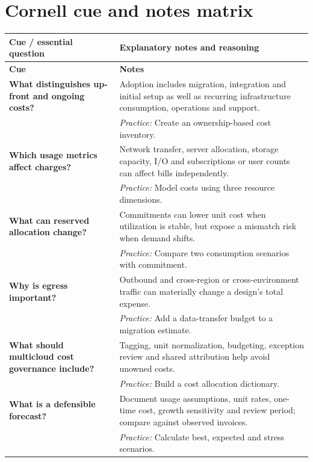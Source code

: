 \documentclass[10pt,letterpaper]{article}
\begin{document}
\section{Cornell cue and notes matrix}
\small\setlength{\LTleft}{0pt}\setlength{\LTright}{0pt plus 1fill}
\begin{longtable}{>{\RaggedRight\arraybackslash}p{}>{\RaggedRight\arraybackslash}p{}}
\toprule\textbf{Cue / essential question}&\textbf{Explanatory notes and reasoning}\\\midrule\endfirsthead\toprule\textbf{Cue}&\textbf{Notes}\\\midrule\endhead
\textbf{What distinguishes up-front and ongoing costs?} & Adoption includes migration, integration and initial setup as well as recurring infrastructure consumption, operations and support.\\[3pt]& \textcolor{petrol}{\emph{Practice:} Create an ownership-based cost inventory.}\\[8pt]\midrule
\textbf{Which usage metrics affect charges?} & Network transfer, server allocation, storage capacity, I/O and subscriptions or user counts can affect bills independently.\\[3pt]& \textcolor{petrol}{\emph{Practice:} Model costs using three resource dimensions.}\\[8pt]\midrule
\textbf{What can reserved allocation change?} & Commitments can lower unit cost when utilization is stable, but expose a mismatch risk when demand shifts.\\[3pt]& \textcolor{petrol}{\emph{Practice:} Compare two consumption scenarios with commitment.}\\[8pt]\midrule
\textbf{Why is egress important?} & Outbound and cross-region or cross-environment traffic can materially change a design's total expense.\\[3pt]& \textcolor{petrol}{\emph{Practice:} Add a data-transfer budget to a migration estimate.}\\[8pt]\midrule
\textbf{What should multicloud cost governance include?} & Tagging, unit normalization, budgeting, exception review and shared attribution help avoid unowned costs.\\[3pt]& \textcolor{petrol}{\emph{Practice:} Build a cost allocation dictionary.}\\[8pt]\midrule
\textbf{What is a defensible forecast?} & Document usage assumptions, unit rates, one-time cost, growth sensitivity and review period; compare against observed invoices.\\[3pt]& \textcolor{petrol}{\emph{Practice:} Calculate best, expected and stress scenarios.}\\[8pt]\midrule
\end{longtable}\normalsize
\end{document}
